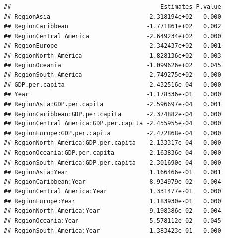 \documentclass[11pt,]{article}
\newenvironment{Shaded}{\begin{snugshade}}{\end{snugshade}}
\newcommand{\CommentTok}[1]{\textcolor[rgb]{0.56,0.35,0.01}{\textit{#1}}}
\newcommand{\DecValTok}[1]{\textcolor[rgb]{0.00,0.00,0.81}{#1}}
\newcommand{\KeywordTok}[1]{\textcolor[rgb]{0.13,0.29,0.53}{\textbf{#1}}}
\newcommand{\NormalTok}[1]{#1}
\newcommand{\OperatorTok}[1]{\textcolor[rgb]{0.81,0.36,0.00}{\textbf{#1}}}
\newcommand{\StringTok}[1]{\textcolor[rgb]{0.31,0.60,0.02}{#1}}
\begin{document}
\begin{verbatim}
##                                          Estimates P.value
## RegionAsia                           -2.318194e+02   0.000
## RegionCaribbean                      -1.771861e+02   0.002
## RegionCentral America                -2.649234e+02   0.000
## RegionEurope                         -2.342437e+02   0.001
## RegionNorth America                  -1.828136e+02   0.003
## RegionOceania                        -1.099626e+02   0.045
## RegionSouth America                  -2.749275e+02   0.000
## GDP.per.capita                        2.432516e-04   0.000
## Year                                 -1.178336e-01   0.000
## RegionAsia:GDP.per.capita            -2.596697e-04   0.001
## RegionCaribbean:GDP.per.capita       -2.374882e-04   0.000
## RegionCentral America:GDP.per.capita -2.455955e-04   0.000
## RegionEurope:GDP.per.capita          -2.472868e-04   0.000
## RegionNorth America:GDP.per.capita   -2.133317e-04   0.000
## RegionOceania:GDP.per.capita         -2.163836e-04   0.000
## RegionSouth America:GDP.per.capita   -2.301690e-04   0.000
## RegionAsia:Year                       1.166466e-01   0.001
## RegionCaribbean:Year                  8.934979e-02   0.004
## RegionCentral America:Year            1.331477e-01   0.000
## RegionEurope:Year                     1.183930e-01   0.000
## RegionNorth America:Year              9.198386e-02   0.004
## RegionOceania:Year                    5.578112e-02   0.045
## RegionSouth America:Year              1.383423e-01   0.000
\end{verbatim}

\begin{Shaded}
\end{Shaded}
\end{document}
